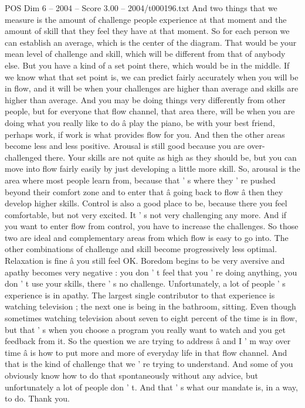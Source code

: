 \begin{textsample}{POS Dim 6 – 2004 – Score 3.00 – 2004/t000196.txt}
And two things that we measure is the amount of challenge people experience at that moment and the amount of skill that they feel they have at that moment.
So for each person we can establish an average, which is the center of the diagram.
That would be your mean level of challenge and skill, which will be different from that of anybody else.
But you have a kind of a set point there, which would be in the middle.
If we know what that set point is, we can predict fairly accurately when you will be in flow, and it will be when your challenges are higher than average and skills are higher than average.
And you may be doing things very differently from other people, but for everyone that flow channel, that area there, will be when you are doing what you really like to do â play the piano, be with your best friend, perhaps work, if work is what provides flow for you.
And then the other areas become less and less positive.
Arousal is still good because you are over-challenged there.
Your skills are not quite as high as they should be, but you can move into flow fairly easily by just developing a little more skill.
So, arousal is the area where most people learn from, because that ' s where they ' re pushed beyond their comfort zone and to enter that â going back to flow â then they develop higher skills.
Control is also a good place to be, because there you feel comfortable, but not very excited.
It ' s not very challenging any more.
And if you want to enter flow from control, you have to increase the challenges.
So those two are ideal and complementary areas from which flow is easy to go into.
The other combinations of challenge and skill become progressively less optimal.
Relaxation is fine â you still feel OK.
Boredom begins to be very aversive and apathy becomes very negative : you don ' t feel that you ' re doing anything, you don ' t use your skills, there ' s no challenge.
Unfortunately, a lot of people ' s experience is in apathy.
The largest single contributor to that experience is watching television ; the next one is being in the bathroom, sitting.
Even though sometimes watching television about seven to eight percent of the time is in flow, but that ' s when you choose a program you really want to watch and you get feedback from it.
So the question we are trying to address â and I ' m way over time â is how to put more and more of everyday life in that flow channel.
And that is the kind of challenge that we ' re trying to understand.
And some of you obviously know how to do that spontaneously without any advice, but unfortunately a lot of people don ' t.
And that ' s what our mandate is, in a way, to do.
Thank you.

\end{textsample}
